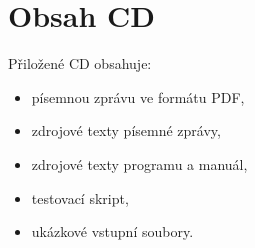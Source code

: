 \chapter{Obsah CD}

Přiložené CD obsahuje:

\begin{itemize}
\item písemnou zprávu ve formátu PDF,
\item zdrojové texty písemné zprávy,
\item zdrojové texty programu a manuál,
\item testovací skript,
\item ukázkové vstupní soubory.
\end{itemize}
